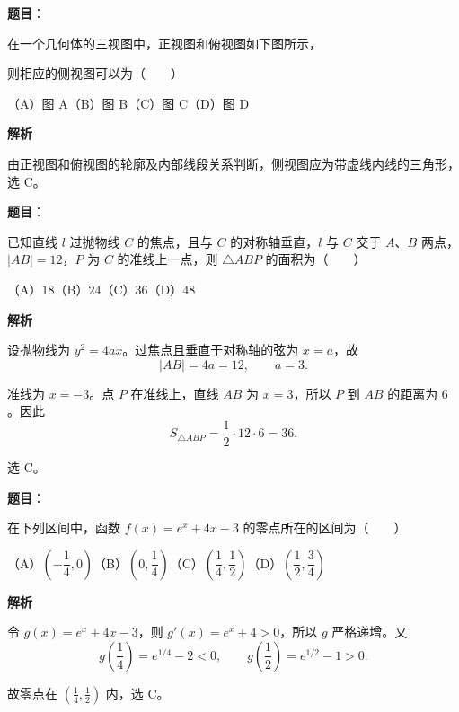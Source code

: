 \begin{answer}

\textbf{题目}：

在一个几何体的三视图中，正视图和俯视图如下图所示，

则相应的侧视图可以为\mbox{（　　）}
\nopagebreak[4]
\begin{center}\end{center}
\nopagebreak[4]
（A）图 A\quad（B）图 B\quad（C）图 C\quad（D）图 D

\textbf{解析}

由正视图和俯视图的轮廓及内部线段关系判断，侧视图应为带虚线内线的三角形，选 C。


\end{answer}
\begin{answer}

\textbf{题目}：

已知直线 $l$ 过抛物线 $C$ 的焦点，且与 $C$ 的对称轴垂直，$l$ 与 $C$ 交于 $A\text{、}B$ 两点，$|AB|=12$，$P$ 为 $C$ 的准线上一点，则 $\triangle ABP$ 的面积为\mbox{（　　）}

（A）$18$\quad（B）$24$\quad（C）$36$\quad（D）$48$

\textbf{解析}

设抛物线为 $y^2=4ax$。过焦点且垂直于对称轴的弦为
$x=a$，故
\nopagebreak[4]
\[
|AB|=4a=12,\qquad a=3.
\]

准线为 $x=-3$。点 $P$ 在准线上，直线 $AB$ 为 $x=3$，所以
$P$ 到 $AB$ 的距离为 $6$。因此
\nopagebreak[4]
\[
S_{\triangle ABP}=\frac12\cdot12\cdot6=36.
\]

选 C。


\end{answer}
\begin{answer}

\textbf{题目}：

在下列区间中，函数 $f(x)=e^x+4x-3$ 的零点所在的区间为\mbox{（　　）}

（A）$\left(-\dfrac14,0\right)$\quad（B）$\left(0,\dfrac14\right)$\quad（C）$\left(\dfrac14,\dfrac12\right)$\quad（D）$\left(\dfrac12,\dfrac34\right)$

\textbf{解析}

令 $g(x)=e^x+4x-3$，则
$g'(x)=e^x+4>0$，所以 $g$ 严格递增。又
\nopagebreak[4]
\[
g\left(\frac14\right)=e^{1/4}-2<0,\qquad
g\left(\frac12\right)=e^{1/2}-1>0.
\]

故零点在 $\left(\frac14,\frac12\right)$ 内，选 C。


\end{answer}
